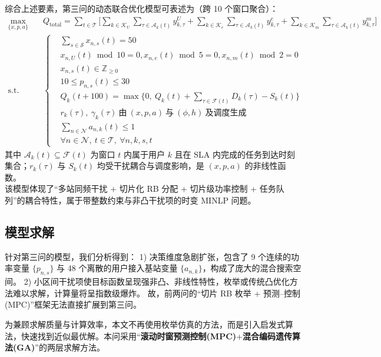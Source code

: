 综合上述要素，第三问的动态联合优化模型可表述为（跨 10 个窗口聚合）：
\begin{equation}
\begin{aligned}
\max_{\{x,p,a\}}\quad & Q_{\text{total}}=\sum_{t\in\mathcal{T}}\Bigg[\sum_{k\in\mathcal{K}_U}\sum_{\tau\in\mathcal{A}_k(t)} y^{U}_{k,\tau}+\sum_{k\in\mathcal{K}_e}\sum_{\tau\in\mathcal{A}_k(t)} y^{e}_{k,\tau}+\sum_{k\in\mathcal{K}_m}\sum_{\tau\in\mathcal{A}_k(t)} y^{m}_{k,\tau}\Bigg] \\
\text{s.t.}\quad & 
\left\{
\begin{aligned}
&\sum_{s\in\mathcal{S}} x_{n,s}(t)=50 \\
&x_{n,U}(t)\bmod 10=0 ,x_{n,e}(t)\bmod 5=0 ,x_{n,m}(t)\bmod 2=0 \\
&x_{n,s}(t)\in\mathbb{Z}_{\ge 0} \\
&10\le p_{n,s}(t)\le 30\\
&Q_k(t+100)=\max\Big\{0,\ Q_k(t)+\sum_{\tau\in\mathcal{F}(t)} D_k(\tau)-S_k(t)\Big\} \\
&r_k(\tau),\ \gamma_k(\tau)\ \text{由}\ (x,p,a)\ \text{与}\ (\phi,h)\ \text{及调度生成} \\
&\sum_{n\in\mathcal{N}} a_{n,k}(t)\le 1 \\
&\forall n\in\mathcal{N},\ t\in\mathcal{T},\ \forall n,k,s,t
\end{aligned}
\right.
\end{aligned}
\end{equation}
其中 $\mathcal{A}_k(t)\subseteq\mathcal{F}(t)$ 为窗口 $t$ 内属于用户 $k$ 且在 SLA 内完成的任务到达时刻集合；$r_k(\tau)$ 与 $S_k(t)$ 均受干扰耦合与调度影响，是 $(x,p,a)$ 的非线性函数。\\
该模型体现了“多站同频干扰 + 切片化 RB 分配 + 切片级功率控制 + 任务队列”的耦合特性，属于带整数约束与非凸干扰项的时变 MINLP 问题。

\subsection{模型求解}
针对第三问的模型，我们分析得到：
1) 决策维度急剧扩张，包含了 9 个连续的功率变量 $\{p_{n,s}\}$ 与 48 个离散的用户接入基站变量 $\{a_{n,k}\}$，构成了庞大的混合搜索空间。
2) 小区间干扰项使目标函数呈现强非凸、非线性特性，枚举或传统凸优化方法难以求解，计算量将呈指数级爆炸。
故，前两问的“切片 RB 枚举 + 预测–控制 (MPC)”框架无法直接扩展到第三问。

为兼顾求解质量与计算效率，本文不再使用枚举仿真的方法，而是引入启发式算法，快速找到近似最优解。本问采用“\textbf{滚动时窗预测控制(MPC)}+\textbf{混合编码遗传算法(GA)}”的两层求解方法。

